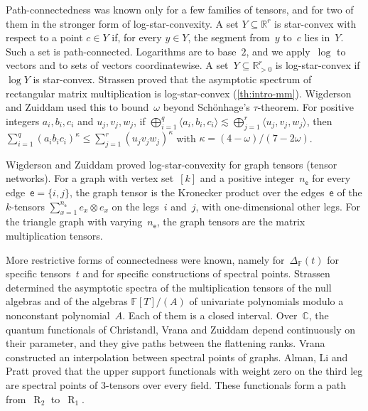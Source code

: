 \documentclass[11pt,letterpaper]{article}
\DeclareMathOperator{\tensorrank}{R}
\newcommand{\FF}{\mathbb{F}}
\newcommand{\RR}{\mathbb{R}}
\newcommand{\CC}{\mathbb{C}}
\newcommand{\asympleq}{\lesssim}
\begin{document}
Path-connectedness was known only for a few families of tensors, and for two of them in the stronger form of log-star-convexity. A set \(Y\subseteq\RR^r\) is star-convex with respect to a point \(c\in Y\) if, for every \(y\in Y\), the segment from~\(y\) to~\(c\) lies in~\(Y\). Such a set is path-connected. Logarithms are to base~\(2\), and we apply~\(\log\) to vectors and to sets of vectors coordinatewise. A set~\(Y\subseteq\RR_{>0}^r\) is log-star-convex if \(\log Y\) is star-convex. Strassen \cite[Corollary~6.6]{strassen1988asymptotic} proved that the asymptotic spectrum of rectangular matrix multiplication is log-star-convex (\cref{th:intro-mm}). Wigderson and Zuiddam \cite[Corollary~9.11]{wigderson2022asymptotic} used this to bound~\(\omega\) beyond Schönhage's \(\tau\)-theorem. For positive integers \(a_i,b_i,c_i\) and \(u_j,v_j,w_j\), if \(\bigoplus_{i=1}^q\langle a_i,b_i,c_i\rangle\asympleq\bigoplus_{j=1}^r\langle u_j,v_j,w_j\rangle\), then \(\sum_{i=1}^q(a_ib_ic_i)^\kappa\leq\sum_{j=1}^r(u_jv_jw_j)^\kappa\) with \(\kappa=(4-\omega)/(7-2\omega)\). 

Wigderson and Zuiddam \cite[Theorem~12.23]{wigderson2022asymptotic} proved log-star-convexity for graph tensors (tensor networks). For a graph with vertex set~\([k]\) and a positive integer~\(n_{\mathsf{e}}\) for every edge~\(\mathsf{e}=\{i,j\}\), the graph tensor is the Kronecker product over the edges~\(\mathsf{e}\) of the \(k\)-tensors \(\sum_{x=1}^{n_{\mathsf{e}}}e_x\otimes e_x\) on the legs~\(i\) and~\(j\), with one-dimensional other legs. For the triangle graph with varying~$n_{\mathsf{e}}$, the graph tensors are the matrix multiplication tensors. 

More restrictive forms of connectedness were known, namely for~\(\Delta_\FF(t)\) for specific tensors~\(t\) and for specific constructions of spectral points. Strassen \cite[Section~6]{strassen1991degeneration} determined the asymptotic spectra of the multiplication tensors of the null algebras and of the algebras \(\FF[T]/(A)\) of univariate polynomials modulo a nonconstant polynomial~\(A\). Each of them is a closed interval. Over~\(\CC\), the quantum functionals of Christandl, Vrana and Zuiddam \cite{MR4495838} depend continuously on their parameter, and they give paths between the flattening ranks. Vrana \cite{MR4357434} constructed an interpolation between spectral points of graphs. Alman, Li and Pratt \cite[Corollary~8.7]{alman2026edgeasymptoticspectrumtensors} proved that the upper support functionals with weight zero on the third leg are spectral points of \(3\)-tensors over every field. These functionals form a path from~\(\tensorrank_2\) to~\(\tensorrank_1\).
\end{document}
